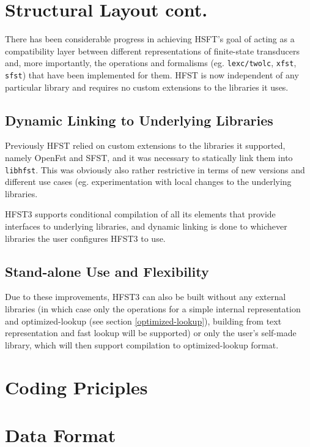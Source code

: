 \documentclass{llncs}
\begin{document}
\section{Structural Layout cont.}
There has been considerable progress in achieving HSFT's goal of acting as a
compatibility layer between different representations of finite-state
transducers and, more importantly, the operations and formalisms (eg.
\verb+lexc/twolc+, \verb+xfst+, \verb+sfst+) that have been implemented
for them. HFST is now independent of any particular library and requires no
custom extensions to the libraries it uses.

\subsection{Dynamic Linking to Underlying Libraries}
Previously HFST relied on custom extensions to the libraries it supported,
namely OpenFst and SFST, and it was necessary to statically link them into
\verb+libhfst+. This was obviously also rather restrictive in terms of
new versions and different use cases (eg. experimentation with local changes to
the underlying libraries.

HFST3 supports conditional compilation of all its elements that provide
interfaces to underlying libraries, and dynamic linking is done to whichever
libraries the user configures HFST3 to use.

\subsection{Stand-alone Use and Flexibility}
Due to these improvements, HFST3 can also be built without any external
libraries (in which case only the operations for a simple internal
representation and optimized-lookup (see section \ref{optimized-lookup}),
building from text representation and fast lookup will be supported) or only
the user's self-made library, which will then support compilation to
optimized-lookup format.

\section{Coding Priciples}


\section{Data Format}
\end{document}
